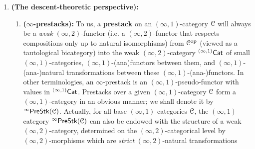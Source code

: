                 \begin{convention} \label{conv: infinity_prestacks}  
                    \noindent
                    \begin{enumerate}
                        \item \textbf{(The descent-theoretic perspective):} \begin{enumerate}
                            \item \textbf{($\infty$-prestacks):} To us, a \textbf{prestack} on an $(\infty, 1)$-category $\mathcal{C}$ will always be a \textit{weak} $(\infty, 2)$-functor (i.e. a $(\infty, 2)$-functor that respects compositions only up to natural isomorphisms) from $\mathcal{C}^{\mathrm{op}}$ (viewed as a tautological bicategory) into the weak $(\infty, 2)$-category ${}^{(\infty, 1)}\mathsf{Cat}$ of small $(\infty, 1)$-categories, $(\infty, 1)$-(ana)functors between them, and $(\infty, 1)$-(ana-)natural transformations between these $(\infty, 1)$-(ana-)functors. In other terminologies, an $\infty$-prestack is an $(\infty, 1)$-pseudo-functor with values in ${}^{(\infty, 1)}\mathsf{Cat}$. Prestacks over a given $(\infty, 1)$-category $\mathcal{C}$ form a $(\infty, 1)$-category in an obvious manner; we shall denote it by ${}^{\infty}\mathsf{Pre}\mathsf{Stk}(\mathcal{C})$. Actually, for all base $(\infty, 1)$-categories $\mathcal{C}$, the $(\infty, 1)$-category ${}^{\infty}\mathsf{Pre}\mathsf{Stk}(\mathcal{C})$ can also be endowed with the structure of a weak $(\infty, 2)$-category, determined on the $(\infty, 2)$-categorical level by $(\infty, 2)$-morphisms which are \textit{strict} $(\infty, 2)$-natural transformations
                            

\end{enumerate}
\end{enumerate}
\end{convention}
